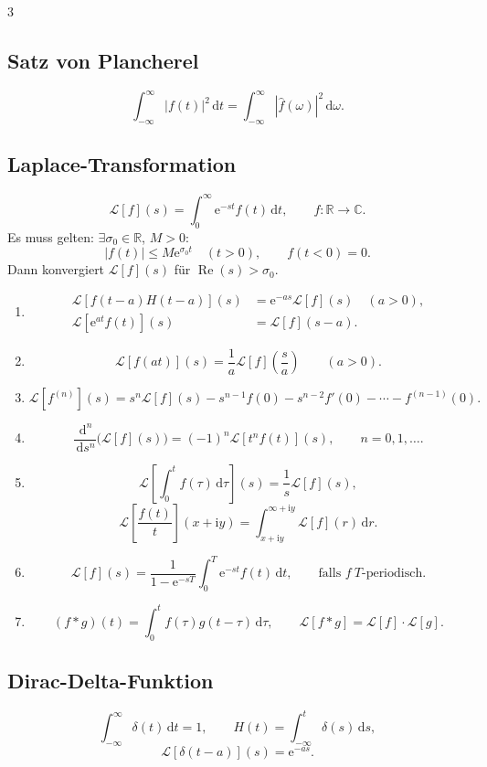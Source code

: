 \documentclass[a4paper,landscape]{article}
\newcommand{\C}{\mathbb C}
\newcommand{\R}{\mathbb R}
\newcommand{\dd}{\,\mathrm d}
\newcommand{\ee}{\mathrm e}
\newcommand{\ii}{\mathrm i}
\begin{document}
\begin{multicols*}{3}
\subsection*{Satz von Plancherel}
\[
\int_{-\infty}^{\infty}|f(t)|^2\dd t=\int_{-\infty}^{\infty}|\hat f(\omega)|^2\dd\omega.
\]

\subsection*{Laplace-Transformation}
\[
\mathcal L[f](s)=\int_0^{\infty}\ee^{-st}f(t)\dd t,\qquad f:\R\to\C.
\]
Es muss gelten: $\exists\sigma_0\in\R$, $M>0$:
\[
|f(t)|\le M\ee^{\sigma_0 t}\quad(t>0),
\qquad f(t<0)=0.
\]
Dann konvergiert $\mathcal L[f](s)$ für $\operatorname{Re}(s)>\sigma_0$.

\begin{enumerate}[label=(\roman*)]
\item
\[
\begin{aligned}
\mathcal L[f(t-a)H(t-a)](s)&=\ee^{-as}\mathcal L[f](s)\quad(a>0),\\
\mathcal L[\ee^{at}f(t)](s)&=\mathcal L[f](s-a).
\end{aligned}
\]
\item
\[
\mathcal L[f(at)](s)=\frac1a\mathcal L[f]\left(\frac{s}{a}\right)\qquad(a>0).
\]
\item
\[
\mathcal L[f^{(n)}](s)=s^n\mathcal L[f](s)-s^{n-1}f(0)-s^{n-2}f'(0)-\cdots-f^{(n-1)}(0).
\]
\item
\[
\frac{\dd^n}{\dd s^n}\bigl(\mathcal L[f](s)\bigr)=(-1)^n\mathcal L[t^n f(t)](s),\qquad n=0,1,\ldots.
\]
\item
\[
\mathcal L\left[\int_0^t f(\tau)\dd\tau\right](s)=\frac1s\mathcal L[f](s),
\]
\[
\mathcal L\left[\frac{f(t)}{t}\right](x+\ii y)=\int_{x+\ii y}^{\infty+\ii y}\mathcal L[f](r)\dd r.
\]
\item
\[
\mathcal L[f](s)=\frac{1}{1-\ee^{-sT}}\int_0^T \ee^{-st}f(t)\dd t,\qquad \text{falls }f\ T\text{-periodisch}.
\]
\item
\[
(f*g)(t)=\int_0^t f(\tau)g(t-\tau)\dd\tau,
\qquad \mathcal L[f*g]=\mathcal L[f]\cdot\mathcal L[g].
\]
\end{enumerate}

\subsection*{Dirac-Delta-Funktion}
\[
\int_{-\infty}^{\infty}\delta(t)\dd t=1,
\qquad H(t)=\int_{-\infty}^{t}\delta(s)\dd s,
\]
\[
\mathcal L[\delta(t-a)](s)=\ee^{-as}.
\]


\end{multicols*}
\end{document}

